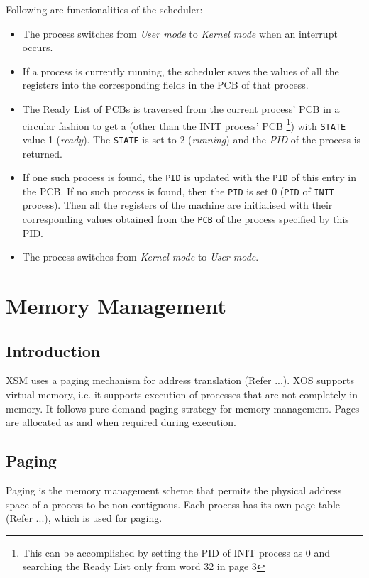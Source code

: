 \documentclass[10pt]{report}
\begin{document}
Following are functionalities of the scheduler:
\begin{itemize}
	\item The process switches from \textit{User mode} to \textit{Kernel mode} when an interrupt occurs.
	\item If a process is currently running, the scheduler saves the values of all the registers into the corresponding fields in the PCB of that process.
	\item The Ready List of PCBs is traversed from the current process' PCB in a circular fashion to get a (other than the INIT process' PCB \footnote{This can be accomplished by setting the PID of INIT process as 0 and searching  the Ready List only from word 32 in page 3}) with \texttt{STATE} value 1 (\textit{ready}). The \texttt{STATE} is set to 2 (\textit{running}) and the \textit{PID} of the process is returned.
	\item If one such process is found, the \texttt{PID} is updated with the \texttt{PID} of this entry in the PCB. If no such process is found, then the \texttt{PID} is set 0 (\texttt{PID} of \texttt{INIT} process). Then all the registers of the machine are initialised with their corresponding values obtained from the \texttt{PCB} of the process specified by this PID.
	
	\item The process switches from \textit{Kernel mode} to \textit{User mode}.
\end{itemize}

\chapter{Memory Management}
\section{Introduction}

XSM uses a paging mechanism for address translation (Refer ...). XOS supports virtual memory, i.e. it supports execution of processes that are not completely in memory. It follows pure demand paging strategy for memory management. Pages are allocated as and when required during execution. 

\section{Paging}

Paging is the memory management scheme that permits the physical address space of a process to be non-contiguous. Each process has its own page table (Refer ...), which is used for paging. 
\end{document}
